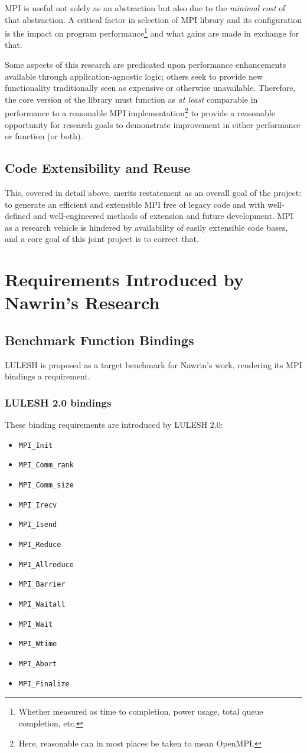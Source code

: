 \documentclass{article}
\newcommand{\itemtt}[1]{\item \texttt{#1}}
\begin{document}
MPI is useful not solely as an abstraction but also due to the \emph{minimal cost} of that abstraction.  A critical factor in selection of MPI library and its configuration is the impact on program performance\footnote{Whether measured as time to completion, power usage, total queue completion, etc.} and what gains are made in exchange for that.  

Some aspects of this research are predicated upon performance enhancements available through application-agnostic logic; others seek to provide new functionality traditionally seen as expensive or otherwise unavailable.  Therefore, the core version of the library must function as \emph{at least} comparable in performance to a reasonable MPI implementation\footnote{Here, reasonable can in most places be taken to mean OpenMPI.} to provide a reasonable opportunity for research goals to demonstrate improvement in either performance or function (or both).

\subsection{Code Extensibility and Reuse}

This, covered in detail above, merits restatement as an overall goal of the project:  to generate an efficient and extensible MPI free of legacy code and with well-defined and well-engineered methods of extension and future development.  MPI as a research vehicle is hindered by availability of easily extensible code bases, and a core goal of this joint project is to correct that.



\section{Requirements Introduced by Nawrin's Research}

\subsection{Benchmark Function Bindings}

LULESH is proposed as a target benchmark for Nawrin's work, rendering its MPI bindings a requirement.

\subsubsection{LULESH 2.0 bindings}
These binding requirements are introduced by LULESH 2.0:
\begin{itemize}
\itemtt{MPI\_Init}
\itemtt{MPI\_Comm\_rank}
\itemtt{MPI\_Comm\_size}
\itemtt{MPI\_Irecv}
\itemtt{MPI\_Isend}
\itemtt{MPI\_Reduce}
\itemtt{MPI\_Allreduce}
\itemtt{MPI\_Barrier}
\itemtt{MPI\_Waitall}
\itemtt{MPI\_Wait}
\itemtt{MPI\_Wtime}
\itemtt{MPI\_Abort}
\itemtt{MPI\_Finalize}
\end{itemize}
\end{document}
